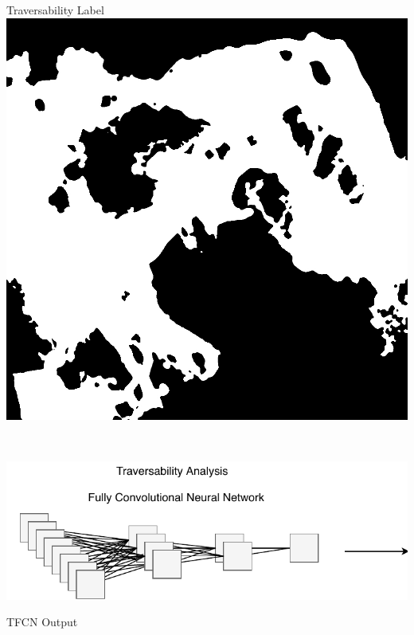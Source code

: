 \documentclass[usenames,dvipsnames,10pt]{beamer}
\begin{document}
\begin{frame}
\begin{minipage}[]{0.3\textwidth}
\end{minipage}
\hspace{0.25cm}
\begin{minipage}[]{0.3\textwidth}
	\centering
	Traversability Label
	\includegraphics[width=\textwidth]{graphics/aerial07-trav.jpg}
\end{minipage} \\
\vspace{0.25cm}
\begin{minipage}[]{0.666\textwidth}
	\includegraphics[width=\textwidth]{graphics/tfcn2.pdf}
\end{minipage}
\begin{minipage}[]{0.3\textwidth}
	\centering
	TFCN Output

\end{minipage}
\end{frame}
\end{document}
